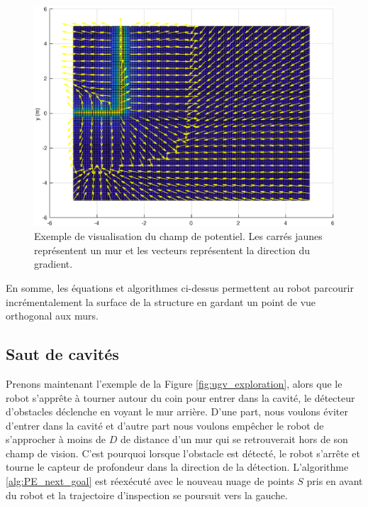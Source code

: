 \begin{figure}[ht]
  \centering
  \includegraphics[width=0.7\linewidth]{images/champ_de_potentiel.eps}
  \caption{Exemple de visualisation du champ de potentiel. Les carrés jaunes représentent un mur et les vecteurs représentent la direction du gradient. }
  \label{fig:potential_field}
\end{figure}

En somme, les équations et algorithmes ci-dessus permettent au robot parcourir incrémentalement la surface de la structure en gardant un point de vue orthogonal aux murs.

\subsection{Saut de cavités}
\label{subsec:ugv_cavity_skip}

Prenons maintenant l'exemple de la Figure \ref{fig:ugv_exploration}, alors que le robot s'apprête à tourner autour du coin pour entrer dans la cavité, le détecteur d'obstacles déclenche en voyant le mur arrière. D'une part, nous voulons éviter d'entrer dans la cavité et d'autre part nous voulons empêcher le robot de s'approcher à moins de $D$ de distance d'un mur qui se retrouverait hors de son champ de vision. C'est pourquoi lorsque l'obstacle est détecté, le robot s'arrête et tourne le capteur de profondeur dans la direction de la détection. L'algorithme \ref{alg:PE_next_goal} est réexécuté avec le nouveau nuage de points $S$ pris en avant du robot et la trajectoire d'inspection se poursuit vers la gauche.

